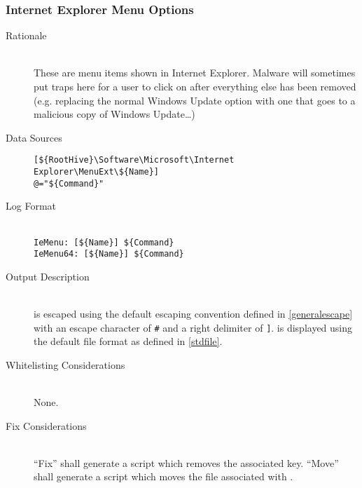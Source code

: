 \subsubsection{Internet Explorer Menu Options}
\begin{description}
\item[Rationale] \hfill \\
These are menu items shown in Internet Explorer. Malware will sometimes put
traps here for a user to click on after everything else has been removed (e.g.
replacing the normal Windows Update option with one that goes to a malicious
copy of Windows Update\ldots)
\item[Data Sources] \hfill
\begin{verbatim}
[${RootHive}\Software\Microsoft\Internet Explorer\MenuExt\${Name}]
@="${Command}"
\end{verbatim}
\item[Log Format] \hfill \\
\verb|IeMenu: [${Name}] ${Command}| \\
\verb|IeMenu64: [${Name}] ${Command}|
\item[Output Description] \hfill \\
 is escaped using the default escaping convention defined in
\ref{generalescape} with an escape character of \verb|#| and a right delimiter
of \verb|]|.  is displayed using the default file format as defined
in \ref{stdfile}.
\item[Whitelisting Considerations] \hfill \\
None.
\item[Fix Considerations] \hfill \\
``Fix'' shall generate a script which removes the associated key. ``Move'' shall
generate a script which moves the file associated with .
\end{description}

